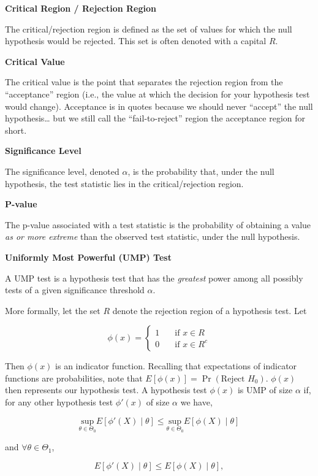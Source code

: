 \documentclass[
  letterpaper,
  DIV=11,
  numbers=noendperiod]{scrreprt}
\begin{document}
\textbf{Critical Region / Rejection Region}

The critical/rejection region is defined as the set of values for which
the null hypothesis would be rejected. This set is often denoted with a
capital \(R\).

\textbf{Critical Value}

The critical value is the point that separates the rejection region from
the ``acceptance'' region (i.e., the value at which the decision for
your hypothesis test would change). Acceptance is in quotes because we
should never ``accept'' the null hypothesis\ldots{} but we still call
the ``fail-to-reject'' region the acceptance region for short.

\textbf{Significance Level}

The significance level, denoted \(\alpha\), is the probability that,
under the null hypothesis, the test statistic lies in the
critical/rejection region.

\textbf{P-value}

The p-value associated with a test statistic is the probability of
obtaining a value \emph{as or more extreme} than the observed test
statistic, under the null hypothesis.

\textbf{Uniformly Most Powerful (UMP) Test}

A UMP test is a hypothesis test that has the \emph{greatest} power among
all possibly tests of a given significance threshold \(\alpha\).

More formally, let the set \(R\) denote the rejection region of a
hypothesis test. Let

\[
\phi(x) = \begin{cases} 1 & \quad \text{if } x \in R \\ 0 & \quad \text{if } x \in R^c \end{cases}
\]

Then \(\phi(x)\) is an indicator function. Recalling that expectations
of indicator functions are probabilities, note that
\(E[\phi(x)] = \Pr(\text{Reject } H_0)\). \(\phi(x)\) then represents
our hypothesis test. A hypothesis test \(\phi(x)\) is UMP of size
\(\alpha\) if, for any other hypothesis test \(\phi'(x)\) of size
\(\alpha\) we have,

\[
\underset{\theta \in \Theta_0}{\text{sup}} E[\phi'(X) \mid \theta] \leq \underset{\theta \in \Theta_0}{\text{sup}} E[\phi(X) \mid \theta]
\]

and \(\forall \theta \in \Theta_1\),

\[
E[\phi'(X) \mid \theta] \leq E[\phi(X) \mid \theta],
\]
\end{document}
